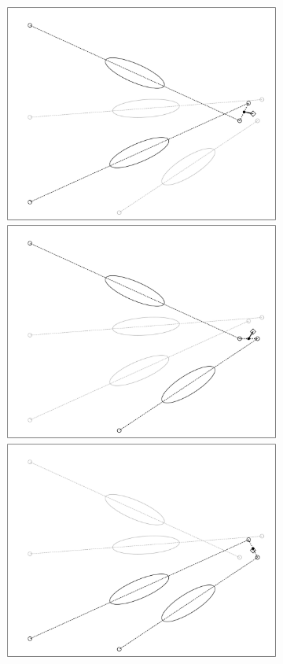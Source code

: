 \begin{figure}
\begin{subfigure}{0.45\textwidth}
    \end{subfigure}
    \begin{subfigure}{0.45\textwidth}
        \includegraphics[width=\linewidth]{Plots/stereo_magic_4.pdf}
        \includegraphics[width=\linewidth]{Plots/stereo_magic_5.pdf} 
        \includegraphics[width=\linewidth]{Plots/stereo_magic_6.pdf} 

\end{subfigure}
\end{figure}
